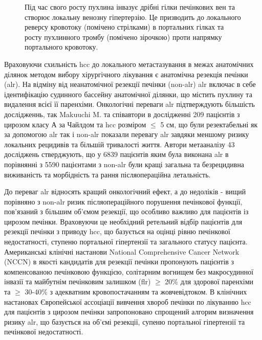 \begin{refsection}
\begin{figure}[h]
\medskip
\small
Під час свого росту пухлина інвазує дрібні гілки печінкових вен та створює локальну венозну гіпертерзію. Це призводить до локального реверсу кровотоку (помічено стрілками) в портальних гілках та росту пухлинного тромбу (помічено зірочкою) проти напрямку портального кровотоку.

\end{figure}




Враховуючи схильність \acrshort{hcc} до локального метастазування в межах анатомічних ділянок методом вибору хірургічного лікування є анатомічна резекція печінки (\acrshort{alr}). На відміну від неанатомічної резекції печінки (\acrshort{non-alr}) \acrshort{alr} включає в себе ідентифікацію судинного бассейну анатомічної ділянки, що містить пухлину та видалення всієї її паренхіми. Онкологічні переваги \acrshort{alr} підтверждують більшість дослідженнь, так Makuuchi M. та співавтори \cite{Shindoh2016} в дослідженні 209 пацієнтів з цирозом класу А за Чайлдом та \acrshort{hcc} розміром $\leq$ 5 см, що були резектабельні як за допомогою \acrshort{alr} так і \acrshort{non-alr} показали перевагу \acrshort{alr} завдяки меншому ризику локальних рецидивів та більшій тривалості життя. Автори метааналізу \cite{Moris2018} 43 досліджень стверджують, що у 6839 пацієнтів яким була виконана \acrshort{alr} в порівнянні з 5590 пацієнтами з \acrshort{non-alr} були кращі загальна та безрецидивна виживаність та морбідність та рання післяопераційна летальність.

До переваг \acrshort{alr} відносять кращий онкологічний ефект, а до недоліків - вищий порівняно з \acrshort{non-alr} ризик післяопераційного порушення печінкової функції, пов'язаний з більшим об'ємом резекції, що особливо важливо для пацієнтів із цирозом печінки. Враховуючи це необхідний ретельний відбір пацієнтів для резекції печінки з приводу \acrshort{hcc}, що базується на оцінці рівню печінкової недостатності, ступеню портальної гіпертензії та загального статусу пацієнта. Американські клінічні настанови National Comprehensive Cancer Network (\acrshort{NCCN}) в якості кандидатів для резекції печінки пропонують пацієнтів з компенсованою печінковою функцією, солітарним вогнищем без макросудинної інвазії та майбутнім печінковим залишком (\acrshort{flr}) $\geq$ 20\% для здорової паренхіми та $\geq$ 30-40\% з адекватним кровопостачанням та жовчевідтоком. В клінічних настановах Європейської ассоціації вивчення хвороб печінки по лікуванню \acrshort{hcc} \cite{Galle2018a} для пацієнтів з цирозом печінки запропоновано спрощений алгорим визначення ризику \acrshort{alr}, що базується на об'ємі резекції, супеню портальної гіпертензії та печінкової недостатності. 



\end{refsection}

